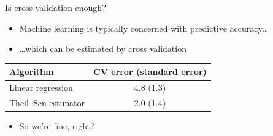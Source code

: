 \begin{frame}{Is cross validation enough?}
  \begin{itemize}
    \item Machine learning is typically concerned with predictive accuracy\dots
    \vspace{\baselineskip}
    \pause
    \item \dots which can be estimated by cross validation
  \end{itemize}
  \begin{center}
    \begin{tabular}{|l|c|}
      \hline
      Algorithm & CV error (standard error) \\
      \hline
      Linear regression & 4.8 (1.3) \\
      Theil--Sen estimator & 2.0 (1.4) \\
      \hline
    \end{tabular}
  \end{center}
  \pause
  \begin{itemize}
    \item So we're fine, right?
  \end{itemize}
\end{frame}

